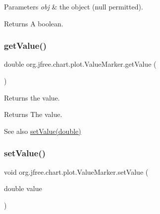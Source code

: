 \begin{DoxyParams}{Parameters}
{\em obj} & the object ({\ttfamily null} permitted).\\
\hline
\end{DoxyParams}
\begin{DoxyReturn}{Returns}
A boolean. 
\end{DoxyReturn}
\mbox{\label{classorg_1_1jfree_1_1chart_1_1plot_1_1_value_marker_a35a29a86d49dfc6421c05bd3e2ea338a}} 
\subsubsection{\texorpdfstring{get\+Value()}{getValue()}}
{\footnotesize\ttfamily double org.\+jfree.\+chart.\+plot.\+Value\+Marker.\+get\+Value (\begin{DoxyParamCaption}{ }\end{DoxyParamCaption})}

Returns the value.

\begin{DoxyReturn}{Returns}
The value.
\end{DoxyReturn}
\begin{DoxySeeAlso}{See also}
\mbox{\hyperlink{classorg_1_1jfree_1_1chart_1_1plot_1_1_value_marker_ada4141a954851d1d3a918c0a1f79398b}{set\+Value(double)}} 
\end{DoxySeeAlso}
\mbox{\label{classorg_1_1jfree_1_1chart_1_1plot_1_1_value_marker_ada4141a954851d1d3a918c0a1f79398b}} 
\subsubsection{\texorpdfstring{set\+Value()}{setValue()}}
{\footnotesize\ttfamily void org.\+jfree.\+chart.\+plot.\+Value\+Marker.\+set\+Value (\begin{DoxyParamCaption}\item[{double}]{value }\end{DoxyParamCaption})}

